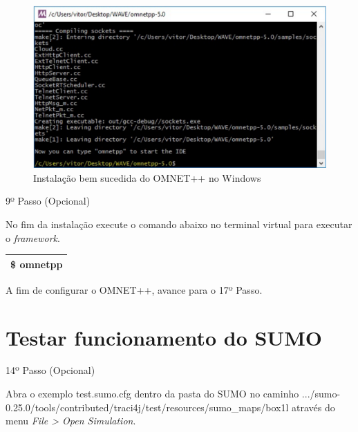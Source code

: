 \documentclass[
12pt,				%
openright,			%
oneside,			%
a4paper,			%
brazil,				%
]{abntex2}
\begin{document}
{\begin{anexosenv}
	                \begin{figure} [H]
		                \centering
		                \includegraphics[scale=.37]{figuras/aneB/52ConfiguracaoOmnet}
		                \caption{\label{fig_52}Instalação bem sucedida do OMNET++ no Windows}
	                \end{figure}
                    

                	\begin{description}
		                \item[9º Passo (Opcional)]
		            \end{description}
		            \par No fim da instalação execute o comando abaixo no terminal virtual para executar o \textit{framework}.
		
		            \begin{table}[H]
			            \renewcommand{\arraystretch}{1.5}
		                \begin{tabular}{|p{15.5cm}|}
			                \hline
                            \$ omnetpp \\
			                \hline
			            \end{tabular}
		            \end{table}
		            
		            \par A fim de configurar o OMNET++, avance para o 17º Passo. %
				
        	\section{Testar funcionamento do SUMO}

            	\begin{description}
	                \item[14º Passo (Opcional)]
	            \end{description}
	            \par Abra o exemplo test.sumo.cfg dentro da pasta do SUMO no caminho .../sumo-0.25.0/tools/contributed/traci4j/test/resources/sumo\_maps/box1l através do menu \textit{File > Open Simulation}.
		            

\end{anexosenv}}
\end{document}
